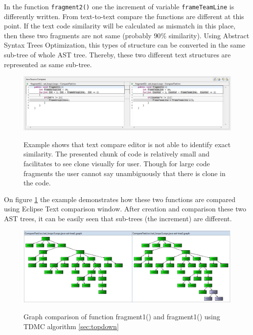 \documentclass{report}
\begin{document}
In the function \texttt{fragment2()} one the increment of variable \texttt{frameTeamLine} is differently written. From text-to-text compare the functions are different at this point. If the text code similarity will be calculated as mismatch in this place, then these two fragments are not same (probably $90\%$ similarity). Using Abstract Syntax Trees Optimization, this types of structure can be converted in the same sub-tree of whole AST tree. Thereby, these two different text structures are represented as same sub-tree. 

\vspace{4mm}

\begin{figure}[h]
  \centering
  \includegraphics[width=1.00\textwidth]{Figures/AST-optimization/text-to-text-compare.png}\\[0.1cm]
  \caption[Example shows that text compare is not able to identify similarity]{Example shows that text compare editor is not able to identify exact similarity. The presented chunk of code is relatively small and facilitates to see clone visually for user. Though for large code fragments the user cannot say unambiguously that there is clone in the code. }
  \label{fig:text-to-text-compare}
\end{figure}

On figure \ref{fig:text-to-text-compare} the example demonstrates how these two functions are compared using Eclipse Text comparison window. After creation and comparison these two AST trees, it can be easily seen that sub-trees (the increment) are different.

\begin{figure}[h]
  \centering
  \includegraphics[width=1.00\textwidth]{Figures/AST-optimization/tree-compared1}\\[0.1cm]
  \caption[Graph comparison on similar AST trees using TDMC algorithm]{Graph comparison of function fragment1() and fragment1() using TDMC algorithm \ref{sec:topdown}}
  \label{fig:ast-graph-compare-similar-tdmc}
\end{figure}
\end{document}
